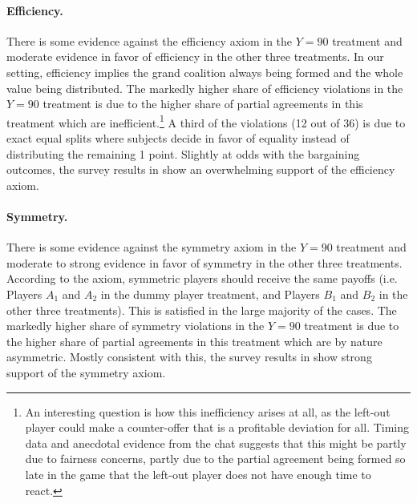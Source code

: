 \paragraph{Efficiency.} There is some evidence against the efficiency axiom in the $Y=90$ treatment and moderate evidence in favor of efficiency in the other three treatments. In our setting, efficiency implies the grand coalition always being formed and the whole value being distributed. 
The markedly higher share of efficiency violations in the $Y=90$ treatment is due to the higher share of partial agreements in this treatment which are inefficient.\footnote{An interesting question is how this inefficiency arises at all, as the left-out player could make a counter-offer that is a profitable deviation for all. Timing data and anecdotal evidence from the chat suggests that this might be partly due to fairness concerns, partly due to the partial agreement being formed so late in the game that the left-out player does not have enough time to react.} A third of the violations (12 out of 36) is due to exact equal splits where subjects decide in favor of equality instead of distributing the remaining 1 point. 
Slightly at odds with the bargaining outcomes, the survey results in  show an overwhelming support of the efficiency axiom.

\paragraph{Symmetry.} There is some evidence against the symmetry axiom in the $Y=90$ treatment and moderate to strong evidence in favor of symmetry in the other three treatments. According to the axiom, symmetric players should receive the same payoffs (i.e. Players $A_1$ and $A_2$ in the dummy player treatment, and Players $B_1$ and $B_2$ in the other three treatments). This is satisfied in the large majority of the cases. The markedly higher share of symmetry violations in the $Y=90$ treatment is due to the higher share of partial agreements in this treatment which are by nature asymmetric. Mostly consistent with this, the survey results in  show strong support of the symmetry axiom.

